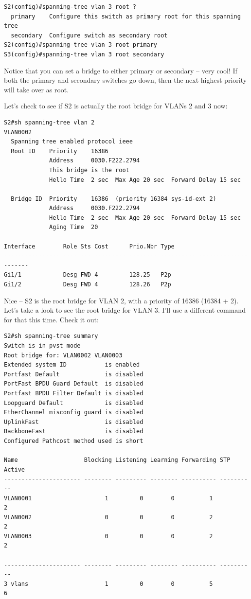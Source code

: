 \documentclass[b5paper,11pt]{memoir}
\begin{document}
\begin{verbatim}
S2(config)#spanning-tree vlan 3 root ?
  primary    Configure this switch as primary root for this spanning tree
  secondary  Configure switch as secondary root
S2(config)#spanning-tree vlan 3 root primary
S3(config)#spanning-tree vlan 3 root secondary
\end{verbatim}

Notice that you can
set a bridge to either primary or secondary -- very cool! If both the
primary and secondary switches go down, then the next highest priority
will take over as root.

Let's check to see if S2 is actually the root bridge for VLANs 2 and 3
now:

\begin{verbatim}
S2#sh spanning-tree vlan 2
VLAN0002
  Spanning tree enabled protocol ieee
  Root ID    Priority    16386
             Address     0030.F222.2794
             This bridge is the root
             Hello Time  2 sec  Max Age 20 sec  Forward Delay 15 sec
 
  Bridge ID  Priority    16386  (priority 16384 sys-id-ext 2)
             Address     0030.F222.2794
             Hello Time  2 sec  Max Age 20 sec  Forward Delay 15 sec
             Aging Time  20
 
Interface        Role Sts Cost      Prio.Nbr Type
---------------- ---- --- --------- -------- --------------------------------
Gi1/1            Desg FWD 4         128.25   P2p
Gi1/2            Desg FWD 4         128.26   P2p
\end{verbatim}

Nice -- S2 is the root bridge for VLAN 2, with a priority of 16386 (16384
+ 2). Let's take a look to see the root bridge for VLAN 3. I'll use a
different command for that this time. Check it out:

\begin{verbatim}
S2#sh spanning-tree summary
Switch is in pvst mode
Root bridge for: VLAN0002 VLAN0003
Extended system ID           is enabled
Portfast Default             is disabled
PortFast BPDU Guard Default  is disabled
Portfast BPDU Filter Default is disabled
Loopguard Default            is disabled
EtherChannel misconfig guard is disabled
UplinkFast                   is disabled
BackboneFast                 is disabled
Configured Pathcost method used is short
 
Name                   Blocking Listening Learning Forwarding STP Active
---------------------- -------- --------- -------- ---------- ----------
VLAN0001                     1         0        0          1          2
VLAN0002                     0         0        0          2          2
VLAN0003                     0         0        0          2          2
 
---------------------- -------- --------- -------- ---------- ----------
3 vlans                      1         0        0          5          6
\end{verbatim}
\end{document}
